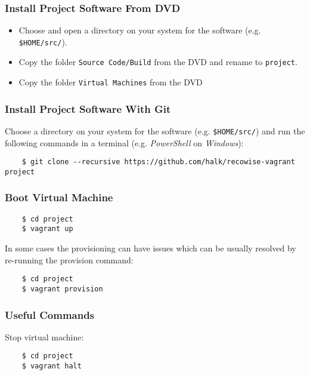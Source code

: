 \subsubsection{Install Project Software From DVD}

\begin{itemize}
\item Choose and open a directory on your system for the software (e.g. \texttt{\$HOME/src/}).
\item Copy the folder \texttt{Source Code/Build} from the DVD and rename to \texttt{project}.
\item Copy the folder \texttt{Virtual Machines} from the DVD
\end{itemize}

\subsubsection{Install Project Software With Git}

Choose a directory on your system for the software (e.g. \texttt{\$HOME/src/}) and run the following commands in a terminal (e.g. \emph{PowerShell} on \emph{Windows}):

\begin{verbatim}
    $ git clone --recursive https://github.com/halk/recowise-vagrant project
\end{verbatim}

\subsubsection{Boot Virtual Machine}

\begin{verbatim}
    $ cd project
    $ vagrant up
\end{verbatim}

In some cases the provisioning can have issues which can be usually resolved by re-running the provision command:

\begin{verbatim}
    $ cd project
    $ vagrant provision
\end{verbatim}

\subsubsection{Useful Commands}

Stop virtual machine:

\begin{verbatim}
    $ cd project
    $ vagrant halt
\end{verbatim}

